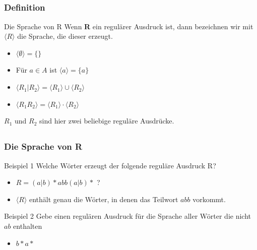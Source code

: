 \subsection*{}
\begin{frame}
  \frametitle{Definition}
	\begin{block}{Die Sprache von R}
		Wenn \textbf{R} ein regulärer Ausdruck ist, dann bezeichnen wir mit \textbf{$\langle R \rangle$} die Sprache, die dieser erzeugt.\\
  		\begin{itemize}
    			\item $\langle \emptyset \rangle =\{\}$
			\item Für $a \in A$ ist $\langle a \rangle=\{a\}$
			\item $\langle R_1 | R_2 \rangle = \langle R_1 \rangle \cup \langle R_2 \rangle$
			\item $\langle R_1 R_2 \rangle = \langle R_1 \rangle \cdot \langle R_2 \rangle$
  		\end{itemize}
	$R_1$ und $R_2$ sind hier zwei beliebige reguläre Ausdrücke.


	\end{block}
\end{frame}

\subsection*{}
\begin{frame}
  \frametitle{Die Sprache von R}
	\begin{block}{Beispiel 1}
		Welche Wörter erzeugt der folgende reguläre Ausdruck R?
  		\begin{itemize}
			\item $R=(a|b)*abb(a|b)*$ ? \pause
			\item $\langle R \rangle$ enthält genau die Wörter, in denen das Teilwort $abb$ vorkommt.
  		\end{itemize}
	\end{block}

	
	\begin{block}{Beispiel 2}
		Gebe einen regulären Ausdruck für die Sprache aller Wörter die nicht $ab$
		enthalten
  		\begin{itemize} \pause
			\item $ {b*} {a*}$
  		\end{itemize}
	\end{block}
	
\end{frame}

